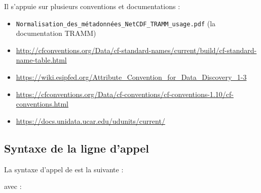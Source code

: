 \medbreak
Il s'appuie sur plusieurs conventions et documentations :
\begin{itemize}
\item
  \texttt{Normalisation\_des\_métadonnées\_NetCDF\_TRAMM\_usage.pdf}
  (la documentation TRAMM)
\item
  \url{http://cfconventions.org/Data/cf-standard-names/current/build/cf-standard-name-table.html}
\item
  \url{https://wiki.esipfed.org/Attribute\_Convention\_for\_Data\_Discovery\_1-3 }
\item
  \url{https://cfconventions.org/Data/cf-conventions/cf-conventions-1.10/cf-conventions.html}
\item
  \url{https://docs.unidata.ucar.edu/udunits/current/}
\end{itemize}


\subsection{Syntaxe de la ligne d'appel}

La syntaxe d'appel de \prodcdf est la suivante :
\medbreak

\medbreak

avec :
\medbreak

